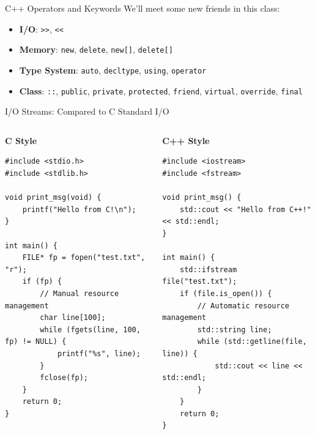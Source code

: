 \begin{frame}[fragile]{C++ Operators and Keywords}
	We'll meet some new friends in this class:
	\begin{itemize}
		\item \textbf{I/O}:  \texttt{>>}, \texttt{<<}
		\item \textbf{Memory}: \texttt{new}, \texttt{delete}, \texttt{new[]}, \texttt{delete[]}
		\item \textbf{Type System}: \texttt{auto}, \texttt{decltype}, \texttt{using}, \texttt{operator}
		\item \textbf{Class}: \texttt{::}, \texttt{public}, \texttt{private}, \texttt{protected}, \texttt{friend}, \texttt{virtual}, \texttt{override}, \texttt{final}
	\end{itemize}
\end{frame}

\begin{frame}[fragile]{I/O Streams: Compared to C Standard I/O}
	\begin{columns}
		\begin{column}{0.5\textwidth}
			\textbf{C Style}
			\begin{verbatim}
#include <stdio.h>
#include <stdlib.h>

void print_msg(void) {
    printf("Hello from C!\n");
}

int main() {
    FILE* fp = fopen("test.txt", "r");
    if (fp) {
        // Manual resource management
        char line[100];
        while (fgets(line, 100, fp) != NULL) {
            printf("%s", line);
        }
        fclose(fp);
    }
    return 0;
}
			\end{verbatim}
		\end{column}
		\begin{column}{0.5\textwidth}
			\textbf{C++ Style}
			\begin{verbatim}
#include <iostream>
#include <fstream>

void print_msg() {
    std::cout << "Hello from C++!" << std::endl;
}

int main() {
    std::ifstream file("test.txt");
    if (file.is_open()) {
        // Automatic resource management
        std::string line;
        while (std::getline(file, line)) {
            std::cout << line << std::endl;
        }
    }
    return 0;
}
			\end{verbatim}
		\end{column}
	\end{columns}
\end{frame}

